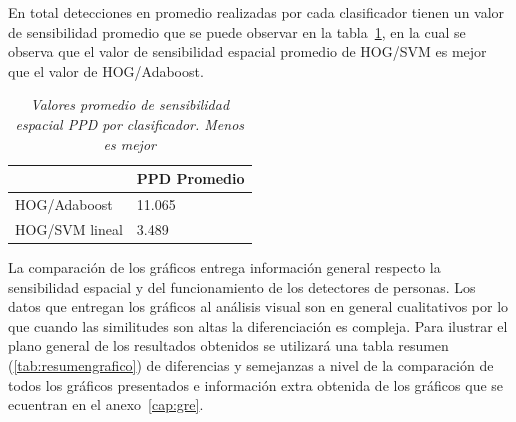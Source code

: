 En total detecciones en promedio realizadas por cada clasificador tienen un valor de sensibilidad promedio que se puede observar en la tabla~\ref{tab:prom1}, en la cual se observa que el valor de sensibilidad espacial promedio de HOG/SVM es mejor que el valor de HOG/Adaboost.

\begin{table}[htc]
\centering
\caption{\em  Valores promedio de sensibilidad espacial PPD por clasificador. Menos es mejor}  
\label{tab:prom1}
\begin{tabular}{l|l|}
\cline{2-2}
                                      & PPD Promedio \\ \hline
\multicolumn{1}{|l|}{HOG/Adaboost}    & 11.065     \\ \hline
\multicolumn{1}{|l|}{HOG/SVM lineal}  & 3.489      \\ \hline
\end{tabular}
\end{table}

La comparación de los gráficos entrega información general respecto la sensibilidad espacial y del funcionamiento de los detectores de personas. Los datos que entregan los gráficos al análisis visual son en general cualitativos por lo que cuando las similitudes son altas la diferenciación es compleja. Para ilustrar el plano general de los resultados obtenidos se utilizará una tabla resumen (\ref{tab:resumengrafico}) de diferencias y semejanzas a nivel de la comparación de todos los gráficos presentados e información extra obtenida de los gráficos que se ecuentran en el anexo~\ref{cap:gre}.

